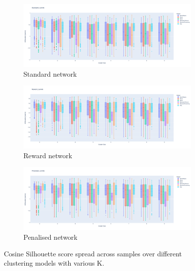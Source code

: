 \begin{figure}[!htb]
    \thispagestyle{plain}
    \centering
    \begin{subfigure}{1.0\linewidth}
        \centering
        \includegraphics[width=1.0\textwidth,height=0.17\textheight]{Sections/Network_I/Resources/P0/Standard_tum4k_sill_spread.png}
        \caption{Standard network}
    \end{subfigure} %

    \begin{subfigure}{1.0\linewidth}
        \centering
        \includegraphics[width=1.0\textwidth,height=0.17\textheight]{Sections/Network_I/Resources/P0/Reward_tum4k_sill_spread.png}
        \caption{Reward network}
    \end{subfigure}
    
    \begin{subfigure}{1.0\linewidth}
        \centering
        \includegraphics[width=1.0\textwidth,height=0.17\textheight]{Sections/Network_I/Resources/P0/Penalised_tum4k_sill_spread.png}      
        \caption{Penalised network}
    \end{subfigure}
    \caption{Cosine Silhouette score spread across samples over different clustering models with various K.}
    \label{fig:N_I:p0_sillhouette_spread}
\end{figure}

